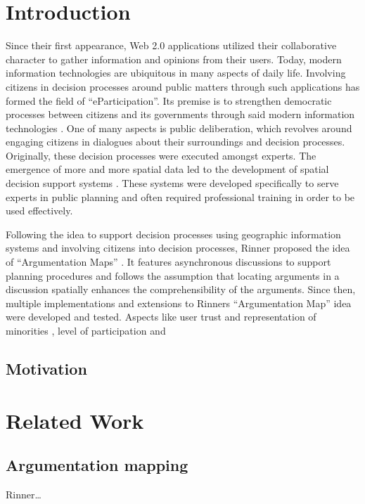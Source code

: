 \documentclass{sigchi}
\begin{document}
\section{Introduction}
Since their first appearance, Web 2.0 applications utilized their collaborative character to gather information and opinions from their users. Today, modern information technologies are ubiquitous in many aspects of daily life. Involving citizens in decision processes around public matters through such applications has formed the field of ``eParticipation''. Its premise is to strengthen democratic processes between citizens and its governments through said modern information technologies \cite{Saebo_eParticipation, Medaglia2012_eParticipation}. One of many aspects is public deliberation, which revolves around engaging citizens in dialogues about their surroundings and decision processes. Originally, these decision processes were executed amongst experts. The emergence of more and more spatial data led to the development of spatial decision support systems \cite{densham_sdss}. These systems were developed specifically to serve experts in public planning and often required professional training in order to be used effectively.

Following the idea to support decision processes using geographic information systems and involving citizens into decision processes, Rinner proposed the idea of ``Argumentation Maps'' \cite{Rinner_ArgumentationMaps}. It features asynchronous discussions to support planning procedures and follows the assumption that locating arguments in a discussion spatially enhances the comprehensibility of the arguments. Since then, multiple implementations and extensions to Rinners ``Argumentation Map'' idea were developed and tested. Aspects like user trust and representation of minorities \cite{Carver2001_PPGIS_Cyberdemocracy}, level of participation \cite{Steinmann2005_Combination_Ladder_GIS} and 

\subsection{Motivation}


\section{Related Work}

\subsection{Argumentation mapping}
Rinner\cite{Rinner_ArgumentationMaps}\dots
\end{document}
